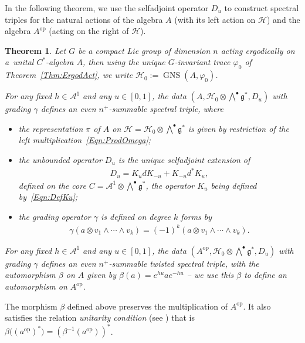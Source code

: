 \documentclass[11pt]{article}
\newtheorem{Theorem}{Theorem}[section]
\newcommand{\Aa}{\mathcal{A}}
\newcommand{\Core}{C}
\newcommand{\Hh}{\mathscr{H}}
\newcommand{\LieG}{\mathfrak{g}}
\DeclareMathOperator{\GNS}{GNS}
\numberwithin{equation}{section}
\begin{document}
In the following theorem, we use the selfadjoint operator $D_u$ to construct spectral triples for the natural actions of the algebra $A$ (with its left action on $\Hh$) and the algebra $A^\text{op}$ (acting on the right of $\Hh$).
\begin{Theorem}
\label{Thm:Main}
Let $G$ be a \emph{compact} Lie group of dimension $n$ acting ergodically on a~unital $C^*$-algebra $A$, then using the unique $G$-invariant trace $\varphi_0$ of Theorem~{\rm \ref{Thm:ErgodAct}}, we write $\Hh_0 := \GNS(A, \varphi_0)$.

For any fixed $h \in \Aa^1$ and any $u \in [0,1]$, the data $(A, \Hh_0 \otimes \bigwedge^\bullet \LieG^*, D_u)$ with grading $\gamma$ defines an even $n^+$-summable spectral triple, where
\begin{itemize}\itemsep=0pt
\item
the representation $\pi$ of $A$ on $\Hh = \Hh_0 \otimes \bigwedge^\bullet \LieG^*$ is given by restriction of the left multiplication~\eqref{Eqn:ProdOmega};
\item
the unbounded operator $D_u$ is the unique selfadjoint extension of
\begin{gather*}
D_{u} = K_{u} d K_{-u} + K_{-u} d^* K_{u},
\end{gather*}
defined on the core $\Core = \Aa^1 \otimes \bigwedge^\bullet \LieG^*$, the operator $K_u$ being defined by~\eqref{Eqn:DefKu};
\item
the grading operator $\gamma$ is defined on degree $k$ forms by
\begin{gather*}
\gamma( a \otimes v_1 \wedge \cdots \wedge v_k) = (-1)^k ( a \otimes v_1 \wedge \cdots \wedge v_k).
\end{gather*}
\end{itemize}
For any fixed $h \in \Aa^1$ and any $u \in [0,1]$, the data $(A^\text{op}, \Hh_0 \otimes \bigwedge^\bullet \LieG^*, D_u)$ with grading $\gamma$ defines an even $n^+$-summable \emph{twisted} spectral triple, with the automorphism $\beta$ on $A$ given by $\beta(a) = e^{h u} a e^{-h u}$ -- we use this $\beta$ to define an automorphism on $A^\text{op}$.
\end{Theorem}

\begin{Remark}
The morphism $\beta$ def\/ined above preserves the multiplication of $A^\text{op}$. It also satisf\/ies the relation \emph{unitarity condition} (see \cite[equation~(3.4)]{TrSpTypeIII}) that is $\beta\big( (a^\text{op})^* \big) = (\beta^{-1}(a^\text{op}))^*$.
\end{Remark}
\end{document}
